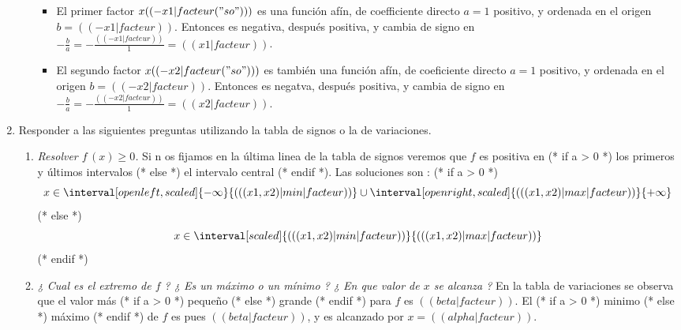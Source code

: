 \begin{enumerate}
\begin{enumerate}
\begin{itemize}
\item El primer factor $x (( -x1|facteur("so") ))$ es una función afín, de coefficiente directo $a=1$ positivo, y ordenada en el origen $b=(( -x1|facteur ))$. Entonces es negativa, después positiva, y cambia de signo en $-\frac{b}{a}=-\frac{(( -x1|facteur ))}{1}=(( x1|facteur ))$.
\item El segundo factor $x (( -x2|facteur("so") ))$ es también una función afín, de coeficiente directo $a=1$ positivo, y ordenada en el origen $b=(( -x2|facteur ))$. Entonces es negatva, después positiva, y cambia de signo en $-\frac{b}{a}=-\frac{(( -x2|facteur ))}{1}=(( x2|facteur ))$.
\end{itemize}
\begin{center}
\end{center}
\end{enumerate}
\item Responder a las siguientes preguntas utilizando la tabla de signos o la de variaciones.
\begin{enumerate}
\item \emph{Resolver $f\,(x)\geqslant0$.} Si n os fijamos en la última linea de la tabla de signos veremos que $f$ es positiva en
(* if a > 0 *) los primeros y últimos intervalos (* else *) el intervalo central (* endif *).
Las soluciones son :
(* if a > 0 *)
   \[ x\in\interval[open left, scaled]{-\infty}{(( (x1, x2)|min|facteur ))} \cup \interval[open right, scaled]{(( (x1, x2)|max|facteur ))}{+\infty} \]
(* else *)
   \[ x\in\interval[scaled]{(( (x1, x2)|min|facteur ))}{(( (x1, x2)|max|facteur ))} \]
(* endif *)
\item \emph{¿ Cual es el extremo de $f$ ? ¿ Es un máximo o un mínimo ? ¿ En que valor de $x$ se alcanza ?} En la tabla de variaciones se observa que el valor más
(* if a > 0 *) pequeño (* else *) grande (* endif *)
para $f$ es $(( beta|facteur ))$. El
(* if a > 0 *) minimo (* else *) máximo (* endif *)
de $f$ es pues $(( beta|facteur ))$, y es alcanzado por $x=(( alpha|facteur ))$.
\end{enumerate}
\end{enumerate}
